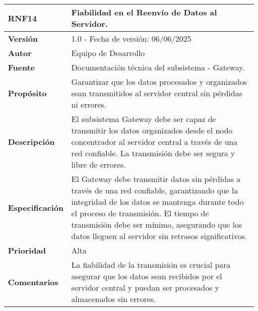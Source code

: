 \begin{longtable}{|l|p{12cm}|}
\hline
\textbf{RNF14} & \textbf{Fiabilidad en el Reenvío de Datos al Servidor.} \\
\hline
\endfirsthead
\hline
\textbf{Versión} & 1.0 - Fecha de versión: 06/06/2025 \\
\hline
\textbf{Autor} & Equipo de Desarrollo \\
\hline
\textbf{Fuente} & Documentación técnica del subsistema - Gateway. \\
\hline
\textbf{Propósito} & Garantizar que los datos procesados y organizados sean transmitidos al servidor central sin pérdidas ni errores. \\
\hline
\textbf{Descripción} & El subsistema Gateway debe ser capaz de transmitir los datos organizados desde el nodo concentrador al servidor central a través de una red confiable. La transmisión debe ser segura y libre de errores. \\
\hline
\textbf{Especificación} & El Gateway debe transmitir datos sin pérdidas a través de una red confiable, garantizando que la integridad de los datos se mantenga durante todo el proceso de transmisión. El tiempo de transmisión debe ser mínimo, asegurando que los datos lleguen al servidor sin retrasos significativos. \\
\hline
\textbf{Prioridad} & Alta \\
\hline
\textbf{Comentarios} & La fiabilidad de la transmisión es crucial para asegurar que los datos sean recibidos por el servidor central y puedan ser procesados y almacenados sin errores. \\
\hline
\end{longtable}


